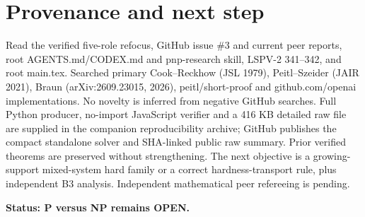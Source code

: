\documentclass[11pt]{article}
\begin{document}
\section{Provenance and next step}
Read the verified five-role refocus, GitHub issue \#3 and current peer reports, root AGENTS.md/CODEX.md and pnp-research skill, LSPV-2 341--342, and root main.tex. Searched primary Cook--Reckhow (JSL 1979), Peitl--Szeider (JAIR 2021), Braun (arXiv:2609.23015, 2026), peitl/short-proof and github.com/openai implementations. No novelty is inferred from negative GitHub searches. Full Python producer, no-import JavaScript verifier and a 416 KB detailed raw file are supplied in the companion reproducibility archive; GitHub publishes the compact standalone solver and SHA-linked public raw summary. Prior verified theorems are preserved without strengthening. The next objective is a growing-support mixed-system hard family or a correct hardness-transport rule, plus independent B3 analysis. Independent mathematical peer refereeing is pending.

\noindent\textbf{Status: P versus NP remains OPEN.}
\end{document}
